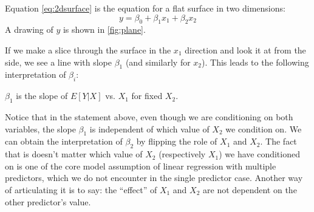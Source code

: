 Equation \ref{eq:2dsurface} is the equation for a flat surface in two dimensions: 
\begin{equation}
y = \beta_0 + \beta_1x_1 + \beta_2x_2
\end{equation}
A drawing of $y$ is shown in \ref{fig:plane}. 

 If we make a slice through the surface in the $x_1$ direction and look it at from the side, we see a line with slope $\beta_1$ (and similarly for $x_2$).  This leads to the following interpretation of $\beta_i$:  
 \begin{center}
 $\beta_1$ is the slope of $E[Y|X]$ vs. $X_1$ for fixed $X_2$. 
 \end{center}
Notice that in the statement above, even though we are conditioning on both variables, the slope $\beta_1$ is independent of which value of $X_2$ we condition on. We can obtain the interpretation of $\beta_2$ by flipping the role of $X_1$ and $X_2$. 
The fact that is doesn't matter which value of $X_2$ (respectively $X_1$) we have conditioned on is one of the core model assumption of linear regression with multiple predictors, which we do not encounter in the single predictor case. Another way of articulating it is to say: the ``effect'' of $X_1$ and $X_2$ are not dependent on the other predictor's value.





